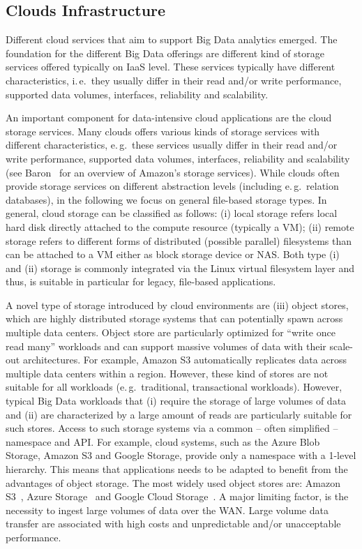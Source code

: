 \documentclass[times]{cpeauth}
\begin{document}
\subsection{Clouds Infrastructure}

Different cloud services that aim to support Big Data analytics emerged. The
foundation for the different Big Data offerings are different kind of storage
services offered typically on IaaS level. These services typically have
different characteristics, i.\,e.\ they usually differ in their read and/or
write performance, supported data volumes, interfaces, reliability and
scalability.

An important component for data-intensive cloud applications are the cloud
storage services. Many clouds offers various kinds of storage services with
different characteristics, e.\,g.\ these services usually differ in their read
and/or write performance, supported data volumes, interfaces, reliability and
scalability (see Baron~\cite{baron2010} for an overview of Amazon's storage
services). While clouds often provide storage services on different
abstraction levels (including e.\,g.\ relation databases), in the following we
focus on general file-based storage types. In general, cloud storage can be
classified as follows: (i) local storage refers local hard disk directly
attached to the compute resource (typically a VM); (ii) remote storage refers
to different forms of distributed (possible parallel) filesystems than can be
attached to a VM either as block storage device or NAS. Both type (i) and (ii)
storage is commonly integrated via the Linux virtual filesystem layer and
thus, is suitable in particular for legacy, file-based applications.

A novel type of storage introduced by cloud environments are (iii) object
stores, which are highly distributed storage systems that can potentially
spawn across multiple data centers. Object store are particularly optimized
for ``write once read many'' workloads and can support massive volumes of data
with their scale-out architectures. For example, Amazon S3 automatically
replicates data across multiple data centers within a region. However, these
kind of stores are not suitable for all workloads (e.\,g.\ traditional,
transactional workloads). However, typical Big Data workloads that (i) require
the storage of large volumes of data and (ii) are characterized by a large
amount of reads are particularly suitable for such stores. Access to such
storage systems via a common -- often simplified -- namespace and API. For
example, cloud systems, such as the Azure Blob Storage, Amazon S3 and Google
Storage, provide only a namespace with a 1-level hierarchy. This means that
applications needs to be adapted to benefit from the advantages of object
storage. The most widely used object stores are: Amazon S3~\cite{amazons3},
Azure Storage~\cite{azure-blob-storage} and Google Cloud
Storage~\cite{google-storage}. A major limiting factor, is the necessity to
ingest large volumes of data over the WAN. Large volume data transfer are
associated with high costs and unpredictable and/or unacceptable performance.
\end{document}
